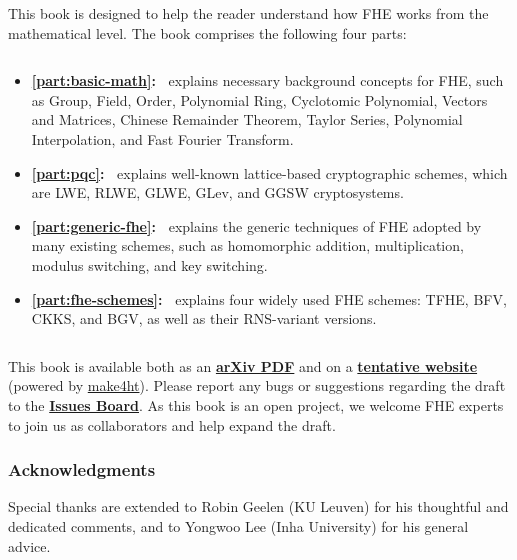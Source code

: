 \documentclass[11pt]{article}
\begin{document}
This book is designed to help the reader understand how FHE works from the mathematical level. The book comprises the following four parts: 

$ $

\begin{itemize}
\item \textbf{\autoref{part:basic-math}:~} explains necessary background concepts for FHE, such as Group, Field, Order, Polynomial Ring, Cyclotomic Polynomial, Vectors and Matrices, Chinese Remainder Theorem, Taylor Series, Polynomial Interpolation, and Fast Fourier Transform.

\item \textbf{\autoref{part:pqc}:~} explains well-known lattice-based cryptographic schemes, which are LWE, RLWE, GLWE, GLev, and GGSW cryptosystems.

\item \textbf{\textbf{\autoref{part:generic-fhe}:~}} explains the generic techniques of FHE adopted by many existing schemes, such as homomorphic addition, multiplication, modulus switching, and key switching. 


\item \textbf{\textbf{\autoref{part:fhe-schemes}:~}} explains four widely used FHE schemes: TFHE, BFV, CKKS, and BGV, as well as their RNS-variant versions.
\end{itemize}

$ $



This book is available both as an \href{https://arxiv.org/abs/2503.05136}{\textbf{arXiv PDF}} and on a \href{https://fhetextbook.github.io} {\textbf{tentative website}} (powered by \href{https://www.kodymirus.cz/overleaf-html-sample/main.html}{make4ht}). 
Please report any bugs or suggestions regarding the draft to the \href{https://github.com/fhetextbook/fhe-textbook/issues}{\textbf{Issues Board}}. As this book is an open project, we welcome FHE experts to join us as collaborators and help expand the draft.



\subsubsection*{Acknowledgments}
Special thanks are extended to Robin Geelen (KU Leuven) for his thoughtful and dedicated comments, and to Yongwoo Lee (Inha University) for his general advice.
\end{document}

